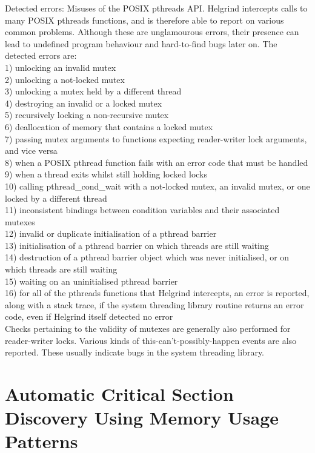 Detected errors: Misuses of the POSIX pthreads API. Helgrind intercepts calls to many POSIX pthreads functions, and is therefore able to report on various common problems. Although these are unglamourous errors, their presence can lead to undefined program behaviour and hard-to-find bugs later on. The detected errors are:\\
1) unlocking an invalid mutex\\
2) unlocking a not-locked mutex\\
3) unlocking a mutex held by a different thread\\
4) destroying an invalid or a locked mutex\\
5) recursively locking a non-recursive mutex\\
6) deallocation of memory that contains a locked mutex\\
7) passing mutex arguments to functions expecting reader-writer lock arguments, and vice versa\\
8) when a POSIX pthread function fails with an error code that must be handled\\
9) when a thread exits whilst still holding locked locks\\
10) calling pthread\_cond\_wait with a not-locked mutex, an invalid mutex, or one locked by a different thread\\
11) inconsistent bindings between condition variables and their associated mutexes\\
12) invalid or duplicate initialisation of a pthread barrier\\
13) initialisation of a pthread barrier on which threads are still waiting\\
14) destruction of a pthread barrier object which was never initialised, or on which threads are still waiting\\
15) waiting on an uninitialised pthread barrier\\
16) for all of the pthreads functions that Helgrind intercepts, an error is reported, along with a stack trace, if the system threading library routine returns an error code, even if Helgrind itself detected no error\\
Checks pertaining to the validity of mutexes are generally also performed for reader-writer locks. Various kinds of this-can't-possibly-happen events are also reported. These usually indicate bugs in the system threading library.

 
\section{Automatic Critical Section Discovery Using Memory Usage Patterns}
